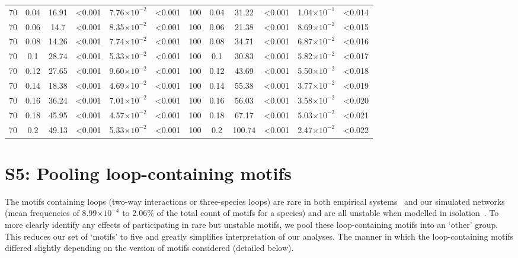 \documentclass[12pt]{article}
\begin{document}
\begin{spacing}{2.0}
\begin{table}[hb!]
\begin{tabular}{c c | c c| c c ||c c | c c | c c |}
            70  & 0.04  & 16.91 & \textless0.001  & 7.76$\times10^{-2}$ & \textless0.001  & 100 & 0.04  & 31.22 & \textless0.001  & 1.04$\times10^{-1}$ & \textless0.014  \\
            70  & 0.06  & 14.7  & \textless0.001  & 8.35$\times10^{-2}$ & \textless0.001  & 100 & 0.06  & 21.38 & \textless0.001  & 8.69$\times10^{-2}$ & \textless0.015  \\
            70  & 0.08  & 14.26 & \textless0.001  & 7.74$\times10^{-2}$ & \textless0.001  & 100 & 0.08  & 34.71 & \textless0.001  & 6.87$\times10^{-2}$ & \textless0.016  \\
            70  & 0.1 & 28.74 & \textless0.001  & 5.33$\times10^{-2}$ & \textless0.001  & 100 & 0.1 & 30.83 & \textless0.001  & 5.82$\times10^{-2}$ & \textless0.017  \\
            70  & 0.12  & 27.65 & \textless0.001  & 9.60$\times10^{-2}$ & \textless0.001  & 100 & 0.12  & 43.69 & \textless0.001  & 5.50$\times10^{-2}$ & \textless0.018  \\
            70  & 0.14  & 18.38 & \textless0.001  & 4.69$\times10^{-2}$ & \textless0.001  & 100 & 0.14  & 55.38 & \textless0.001  & 3.77$\times10^{-2}$ & \textless0.019  \\
            70  & 0.16  & 36.24 & \textless0.001  & 7.01$\times10^{-2}$ & \textless0.001  & 100 & 0.16  & 56.03 & \textless0.001  & 3.58$\times10^{-2}$ & \textless0.020  \\
            70  & 0.18  & 45.95 & \textless0.001  & 4.57$\times10^{-2}$ & \textless0.001  & 100 & 0.18  & 67.17 & \textless0.001  & 5.03$\times10^{-2}$ & \textless0.021  \\
            70  & 0.2 & 49.13 & \textless0.001  & 5.33$\times10^{-2}$ & \textless0.001  & 100 & 0.2 & 100.74  & \textless0.001  & 2.47$\times10^{-2}$ & \textless0.022  \\
        \hline
	    \end{tabular}
	    \end{table}


\clearpage


\section*{S5: Pooling loop-containing motifs} 
	
	The motifs containing loops (two-way interactions or three-species loops) are rare in both empirical systems~\citep{Stouffer2007} and our simulated networks (mean frequencies of 8.99$\times10^{-4}$ to 2.06\% of the total count of motifs for a species) and are all unstable when modelled in isolation~\citep{Borrelli2015a}.
	To more clearly identify any effects of participating in rare but unstable motifs, we pool these loop-containing motifs into an `other' group.
	This reduces our set of `motifs' to five and greatly simplifies interpretation of our analyses.
	The manner in which the loop-containing motifs differed slightly depending on the version of motifs considered (detailed below).



\end{spacing}
\end{document}
